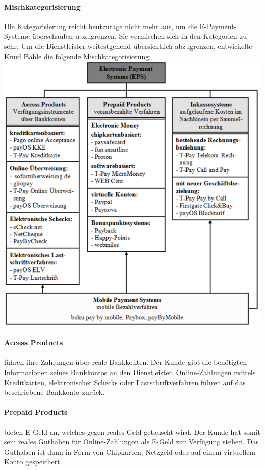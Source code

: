 \paragraph{Mischkategorisierung}
Die Kategorisierung reicht heutzutage nicht mehr aus, um die E-Payment-Systeme überschaubar abzugrenzen. Sie vermischen sich in den Kategorien zu sehr. Um die Dienstleister weitestgehend über\-sichtlich abzugrenzen, entwickelte Knud Bähle die folgende Mischkategorisierung:
\\
\includegraphics[]{img/Mischform.png}

\paragraph{Access Products} führen ihre Zahlungen über reale Bankkonten. Der Kunde gibt die benötigten Informationen seines Bankkontos an den Dienstleister. Online-Zahlungen mittels Kreditkarten, elektronischer Schecks oder Lastschriftverfahren führen auf das beschriebene Bankkonto zurück.

\paragraph{Prepaid Products} bieten E-Geld an, welches gegen reales Geld getauscht wird. Der Kunde hat somit sein reales Guthaben für Online-Zahlungen als E-Geld zur Verfügung stehen. Das Guthaben ist dann in Form von Chipkarten, Netzgeld oder auf einem virtuellem Konto ge\-speichert.


